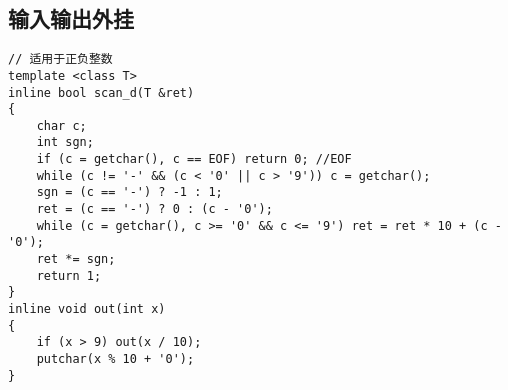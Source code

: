 \documentclass[a4]{article}
\begin{document}
\subsection{输入输出外挂}
\begin{lstlisting}
// 适用于正负整数
template <class T>
inline bool scan_d(T &ret)
{
    char c;
    int sgn;
    if (c = getchar(), c == EOF) return 0; //EOF
    while (c != '-' && (c < '0' || c > '9')) c = getchar();
    sgn = (c == '-') ? -1 : 1;
    ret = (c == '-') ? 0 : (c - '0');
    while (c = getchar(), c >= '0' && c <= '9') ret = ret * 10 + (c - '0');
    ret *= sgn;
    return 1;
}
inline void out(int x)
{
    if (x > 9) out(x / 10);
    putchar(x % 10 + '0');
}
\end{lstlisting}
\end{document}
